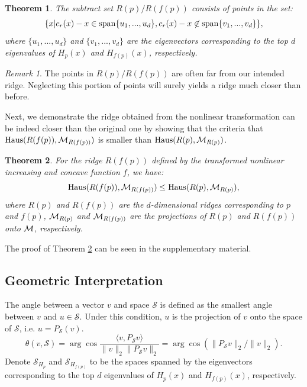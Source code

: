 \documentclass[aos,preprint]{imsart}
\newtheorem{theorem}{Theorem}[section]
\theoremstyle{remark}
\newtheorem*{remark}{Remark}
\begin{document}
\begin{theorem}{The subtract set $R(p)/R(f(p))$ consists of points in the set:
\[
\{ x | c_r(x) - x \in {\rm span} \{u_1,...,u_d\}, c_r(x) - x \not \in {\rm span} \{v_1,...,v_d\}\},
\] 
where $\{u_1,...,u_d\}$ and $\{v_1,...,v_d\}$ are the eigenvectors corresponding to the top $d$ eigenvalues of $H_p(x)$ and $H_{f(p)}(x)$}, respectively. 
\end{theorem}
\begin{remark}
The points in $R(p)/R(f(p))$ are often far from our intended ridge. Neglecting this portion of points will surely yields a ridge much closer than before.
\end{remark}
Next, we demonstrate the ridge obtained from the nonlinear transformation can be indeed closer than the original one by showing that the criteria that ${\rm Haus} (R(f(p)), {\cal M}_{R(f(p))})$ is smaller than ${\rm Haus} (R(p), {\cal M}_{R(p)})$.
\begin{theorem}\label{Transformed Inequality Theorem}
For the ridge $R(f(p))$ defined by the transformed nonlinear increasing and concave function $f$, we have:
\[
{\rm Haus} (R(f(p)), {\cal M}_{R(f(p))}) \leq {\rm Haus} (R(p), {\cal M}_{R(p)}),
\]
where $R(p)$ and $R(f(p))$ are the $d$-dimensional ridges corresponding to $p$ and $f(p)$, ${\cal M}_{R(p)}$ and ${\cal M}_{R(f(p))}$ are the projections of $R(p)$ and $R(f(p))$ onto $\cal M$, respectively.
\end{theorem}
The proof of Theorem \ref{Transformed Inequality Theorem} can be seen in the supplementary material.%
\subsection{Geometric Interpretation}

The angle between a vector $v$ and space $\mathcal S$ is defined as the smallest angle between $v$ and $u \in \mathcal S$. Under this condition, $u$ is the projection of $v$ onto the space of $\mathcal S$, i.e. $u = { P_{\mathcal S}}(v)$. 
\[
\theta(v, {\mathcal S}) = \arg \cos \frac{\langle v, {P}_{\mathcal S} v\rangle }{\|v\|_2 \|{P}_{\mathcal S} v\|_2} =   \arg \cos( \| P_{\mathcal S} v\|_2 / \|v\|_2 ).
\]
 Denote ${\mathcal S}_{H_p}$ and ${\mathcal S}_{H_{f(p)}}$ to be the spaces spanned by the eigenvectors corresponding to the top $d$ eigenvalues of $H_p(x)$ and $H_{f(p)}(x)$, respectively. 
 
\end{document}
